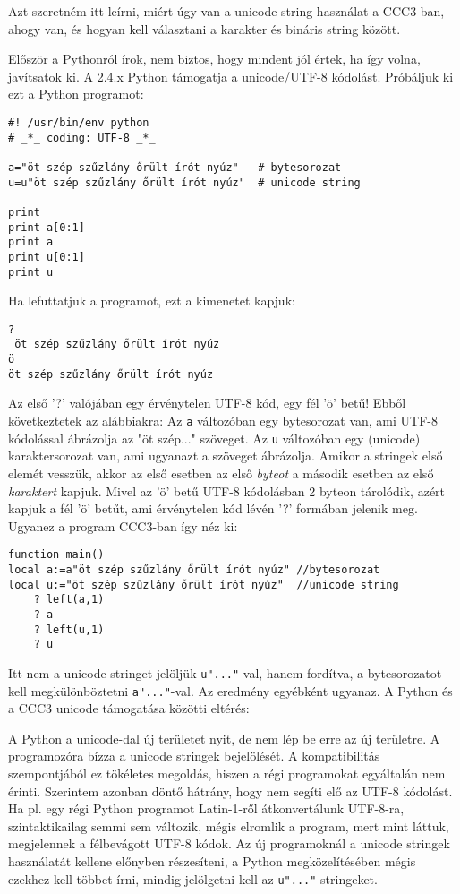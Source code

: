 
Azt szeretném itt leírni, 
miért úgy van a unicode string használat a CCC3-ban, ahogy van,
és hogyan kell választani a karakter és bináris string között. 

Először a Pythonról írok, nem biztos, hogy mindent
jól értek, ha így volna, javítsatok ki.
A 2.4.x Python támogatja a unicode/UTF-8 kódolást.
Próbáljuk ki ezt a Python programot:
\begin{verbatim}
#! /usr/bin/env python
# _*_ coding: UTF-8 _*_

a="öt szép szűzlány őrült írót nyúz"   # bytesorozat
u=u"öt szép szűzlány őrült írót nyúz"  # unicode string

print 
print a[0:1]
print a
print u[0:1]
print u
\end{verbatim}
Ha lefuttatjuk a programot, ezt a kimenetet kapjuk: 
\begin{verbatim}
?
 öt szép szűzlány őrült írót nyúz
ö 
öt szép szűzlány őrült írót nyúz
\end{verbatim}
Az első '?' valójában egy érvénytelen UTF-8 kód, egy fél 'ö' betű!
Ebből következtetek az alábbiakra:
Az \verb!a! változóban egy bytesorozat van, ami UTF-8 kódolással
ábrázolja az "öt szép..." szöveget. Az \verb!u! változóban egy
(unicode) karaktersorozat van, ami ugyanazt a szöveget ábrázolja.
Amikor a stringek első elemét vesszük, akkor az első esetben
az első {\em byteot\/} a második esetben az első {\em karaktert\/}
kapjuk. Mivel az 'ö' betű UTF-8 kódolásban 2 byteon tárolódik,
azért kapjuk a fél 'ö' betűt, ami érvénytelen kód lévén '?' formában
jelenik meg. 
Ugyanez a program CCC3-ban így néz ki:
\begin{verbatim}
function main()
local a:=a"öt szép szűzlány őrült írót nyúz" //bytesorozat
local u:="öt szép szűzlány őrült írót nyúz"  //unicode string
    ? left(a,1)
    ? a
    ? left(u,1)
    ? u
\end{verbatim}
Itt nem a unicode stringet jelöljük \verb!u"..."!-val,
hanem fordítva, a bytesorozatot kell megkülönböztetni \verb!a"..."!-val.
Az eredmény egyébként ugyanaz. A Python és a CCC3 unicode támogatása 
közötti  eltérés:

A Python a unicode-dal új területet nyit, de nem lép be erre
az új területre. A programozóra bízza a unicode stringek bejelölését.
A kompatibilitás szempontjából ez tökéletes megoldás, hiszen a
régi programokat egyáltalán nem érinti. Szerintem azonban döntő
hátrány, hogy nem segíti elő az UTF-8 kódolást. Ha pl. egy régi
Python programot Latin-1-ről átkonvertálunk UTF-8-ra,
szintaktikailag semmi sem változik, mégis elromlik a program,
mert mint láttuk, megjelennek a félbevágott UTF-8 kódok.
Az új programoknál a unicode stringek használatát kellene
előnyben részesíteni, a Python megközelítésében mégis
ezekhez kell többet írni, mindig jelölgetni kell az
\verb!u"..."! stringeket.

